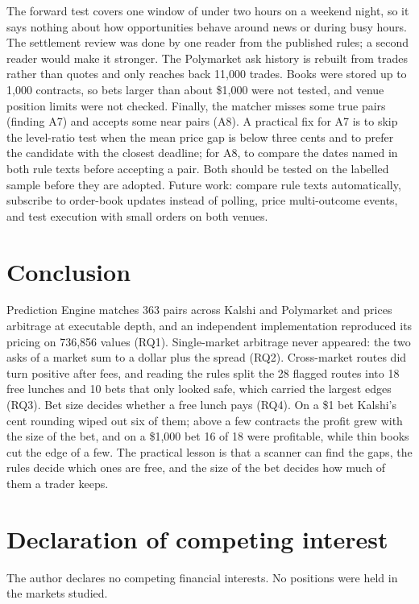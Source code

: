 \documentclass[5p,letterpaper]{elsarticle}
\begin{document}
The forward test covers one window of under two hours on a weekend night, so it says nothing about how opportunities behave around news or during busy hours. The settlement review was done by one reader from the published rules; a second reader would make it stronger. The Polymarket ask history is rebuilt from trades rather than quotes and only reaches back 11,000 trades. Books were stored up to 1,000 contracts, so bets larger than about \$1,000 were not tested, and venue position limits were not checked. Finally, the matcher misses some true pairs (finding A7) and accepts some near pairs (A8). A practical fix for A7 is to skip the level-ratio test when the mean price gap is below three cents and to prefer the candidate with the closest deadline; for A8, to compare the dates named in both rule texts before accepting a pair. Both should be tested on the labelled sample before they are adopted. Future work: compare rule texts automatically, subscribe to order-book updates instead of polling, price multi-outcome events, and test execution with small orders on both venues.

\section{Conclusion}\label{sec:conclusion}

Prediction Engine matches 363 pairs across Kalshi and Polymarket and prices arbitrage at executable depth, and an independent implementation reproduced its pricing on 736,856 values (RQ1). Single-market arbitrage never appeared: the two asks of a market sum to a dollar plus the spread (RQ2). Cross-market routes did turn positive after fees, and reading the rules split the 28 flagged routes into 18 free lunches and 10 bets that only looked safe, which carried the largest edges (RQ3). Bet size decides whether a free lunch pays (RQ4). On a \$1 bet Kalshi's cent rounding wiped out six of them; above a few contracts the profit grew with the size of the bet, and on a \$1,000 bet 16 of 18 were profitable, while thin books cut the edge of a few. The practical lesson is that a scanner can find the gaps, the rules decide which ones are free, and the size of the bet decides how much of them a trader keeps.

\section*{Declaration of competing interest}

The author declares no competing financial interests. No positions were held in the markets studied.
\end{document}
